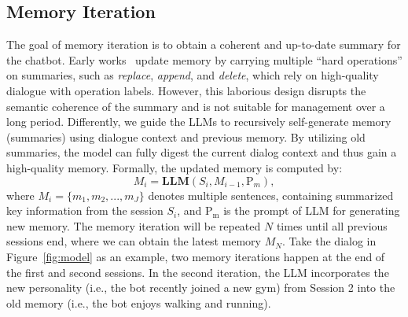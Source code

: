 \documentclass[authoryear,preprint,review,12pt]{elsarticle}
\begin{document}
\subsection{Memory Iteration}
\label{sec:memory_iter}

The goal of memory iteration is to obtain a coherent and up-to-date summary for the chatbot.
Early works~\citep{bae-etal-2022-keep,choi2023effortless} update memory by carrying multiple ``hard operations'' on summaries, such as \textit{replace}, \textit{append}, and \textit{delete}, which rely on high-quality dialogue with operation labels. However, this laborious design disrupts the semantic coherence of the summary and is not suitable for management over a long period. Differently, we guide the LLMs to recursively self-generate memory (summaries) using dialogue context and previous memory. By utilizing old summaries, the model can fully digest the current dialog context and thus gain a high-quality memory. Formally, the updated memory is computed by:
\begin{equation}
    M_i=\boldsymbol{LLM}(S_{i},M_{i-1},\mathrm{P}_{m}),
\end{equation}
where $M_i=\{m_1, m_2, ..., m_J\}$ denotes multiple sentences, containing summarized key information from the session $S_i$, and $\mathrm{P_m}$ is the prompt of LLM for generating new memory. The memory iteration will be repeated $N$ times until all previous sessions end, where we can obtain the latest memory $M_N$. Take the dialog in 
 Figure~\ref{fig:model} as an example, two memory iterations happen at the end of the first and second sessions. In the second iteration, the LLM incorporates the new personality (i.e., the bot recently joined a new gym) from Session 2 into the old memory (i.e., the bot enjoys walking and running).
\end{document}
